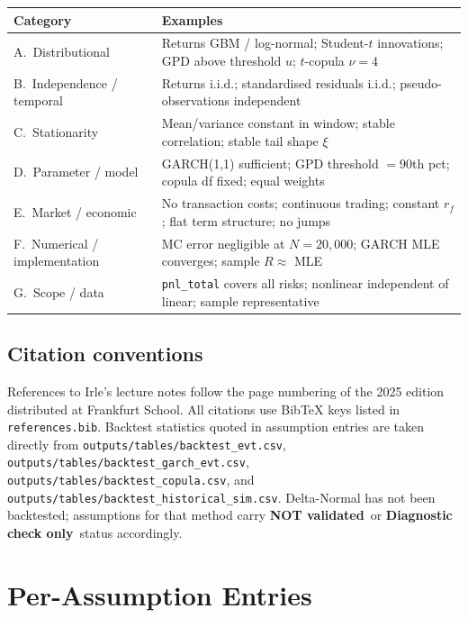 \documentclass[11pt,a4paper]{article}
\newcommand{\code}[1]{\texttt{#1}}
\newcommand{\diagnostic}{\textbf{Diagnostic check only}}
\newcommand{\notvalidated}{\textbf{NOT validated}}
\begin{document}
\medskip
\begin{tabular}{@{}p{4cm}p{10.5cm}@{}}
\toprule
\textbf{Category} & \textbf{Examples} \\
\midrule
A.\ Distributional & Returns GBM / log-normal; Student-$t$ innovations;
  GPD above threshold $u$; $t$-copula $\nu=4$ \\[4pt]
B.\ Independence / temporal & Returns i.i.d.; standardised residuals i.i.d.;
  pseudo-observations independent \\[4pt]
C.\ Stationarity & Mean/variance constant in window; stable correlation;
  stable tail shape $\xi$ \\[4pt]
D.\ Parameter / model & GARCH(1,1) sufficient; GPD threshold $= 90$th pct;
  copula df fixed; equal weights \\[4pt]
E.\ Market / economic & No transaction costs; continuous trading; constant
  $r_f$; flat term structure; no jumps \\[4pt]
F.\ Numerical / implementation & MC error negligible at $N{=}20{,}000$;
  GARCH MLE converges; sample $R \approx$ MLE \\[4pt]
G.\ Scope / data & \code{pnl\_total} covers all risks; nonlinear
  independent of linear; sample representative \\
\bottomrule
\end{tabular}

\subsection{Citation conventions}\label{sec:citations}

References to Irle's lecture notes follow the page numbering of the
2025 edition distributed at Frankfurt School. All citations use
BibTeX keys listed in \code{references.bib}. Backtest statistics
quoted in assumption entries are taken directly from
\code{outputs/tables/backtest\_evt.csv},
\code{outputs/tables/backtest\_garch\_evt.csv},
\code{outputs/tables/backtest\_copula.csv}, and
\code{outputs/tables/backtest\_historical\_sim.csv}.
Delta-Normal has not been backtested; assumptions for that method carry
\notvalidated\ or \diagnostic\ status accordingly.

\section{Per-Assumption Entries}\label{sec:entries}
\end{document}
